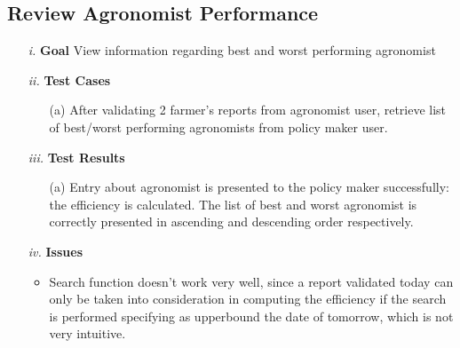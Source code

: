 \documentclass[table, 12pt]{article}
\begin{document}
\subsection{Review Agronomist Performance}
\begin{itemize}
    \item[\textit{i.}] \textbf{Goal} View information regarding best and worst performing agronomist
    \item[\textit{ii.}] \textbf{Test Cases} 
    \begin{itemize}
        \item[(a)] After validating 2 farmer's reports from agronomist user, retrieve list of best/worst performing agronomists from policy maker user.
    \end{itemize} 
    \item[\textit{iii.}] \textbf{Test Results}
    \begin{itemize}
        \item[(a)] Entry about agronomist is presented to the policy maker successfully: the efficiency is calculated. The list of best and worst agronomist is correctly presented in ascending and descending order respectively.
    \end{itemize} 
    \item[\textit{iv.}] \textbf{Issues}
    \begin{itemize}
        \item Search function doesn't work very well, since a report validated today can only be taken into consideration in computing the efficiency if the search is performed specifying as upperbound the date of tomorrow, which is not very intuitive.
    \end{itemize} 
\end{itemize}
\end{document}

